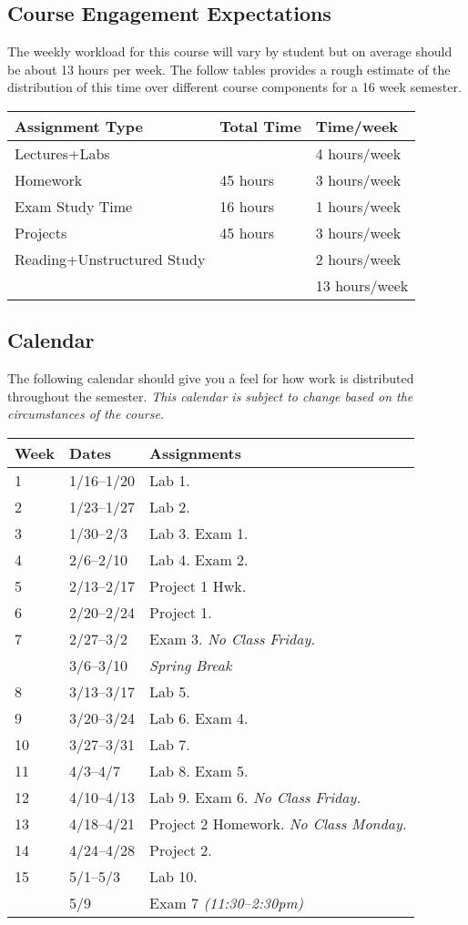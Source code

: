 \documentclass[10pt]{article}
\begin{document}
\subsection{Course Engagement Expectations}

The weekly workload for this course will vary by student but on average should be about 13 hours per week.  The follow tables provides a rough estimate of the distribution of this time over different course components for a 16 week semester.
\begin{center}
\begin{tabular}{lll}
Assignment Type & Total Time & Time/week \\ \toprule
Lectures+Labs &      & 4 hours/week \\
Homework & 45 hours        & 3 hours/week \\
Exam Study Time & 16 hours  & 1 hours/week \\
Projects & 45 hours        & 3 hours/week \\
Reading+Unstructured Study & & 2 hours/week \\
\bottomrule
& & 13 hours/week
\end{tabular}
\end{center}

\subsection{Calendar}

The following calendar should give you a feel for how work is distributed throughout the semester.  \textit{This calendar is subject to change based on the circumstances of the course.}

\begin{center}
\begin{tabular}{lll}
Week & Dates & Assignments \\ \toprule
1 & 1/16--1/20 &  Lab 1.  \\
2 & 1/23--1/27 & Lab 2.   \\
3 & 1/30--2/3 & Lab 3. Exam 1. \\
4 & 2/6--2/10 & Lab 4. Exam 2.\\
5 & 2/13--2/17 & Project 1 Hwk. \\
6 & 2/20--2/24 & Project 1. \\
7 & 2/27--3/2 & Exam 3.
\textit{No Class Friday.} \\
  & 3/6--3/10 & \textit{Spring Break} \\
8 & 3/13--3/17 & Lab 5. \\
9 & 3/20--3/24 & Lab 6. Exam 4. \\
10 & 3/27--3/31 & Lab 7.  \\
11 & 4/3--4/7 & Lab 8. Exam 5.  \\
12 & 4/10--4/13 & Lab 9. Exam 6. \textit{No Class Friday.}   \\
13 & 4/18--4/21 & Project 2 Homework. \textit{No Class Monday.}    \\
14 & 4/24--4/28 &  Project 2. \\
15 & 5/1--5/3 & Lab 10.  \\ \midrule
  & 5/9 & Exam 7 \textit{(11:30--2:30pm)}  \\
\end{tabular}
\end{center}
\end{document}
